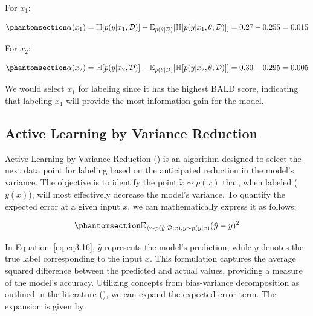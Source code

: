 \documentclass[
  letterpaper,
  numbers=noenddot,
  DIV=11]{scrreprt}
\theoremstyle{plain}
\theoremstyle{definition}
\theoremstyle{plain}
\theoremstyle{remark}
\begin{document}
For \(x_1\):

\begin{equation}\phantomsection\label{eq-eq3.14}{
\alpha(x_1) = \mathbb{H}[p(y|x_1, \mathcal{D})] - \mathbb{E}_{p(\theta|\mathcal{D})}[\mathbb{H}[p(y|x_1, \theta, \mathcal{D})]] = 0.27 - 0.255 = 0.015
}\end{equation}

For \(x_2\):

\begin{equation}\phantomsection\label{eq-eq3.15}{
\alpha(x_2) = \mathbb{H}[p(y|x_2, \mathcal{D})] - \mathbb{E}_{p(\theta|\mathcal{D})}[\mathbb{H}[p(y|x_2, \theta, \mathcal{D})]] = 0.30 - 0.295 = 0.005
}\end{equation}

We would select \(x_1\) for labeling since it has the highest BALD
score, indicating that labeling \(x_1\) will provide the most
information gain for the model.

\subsection{Active Learning by Variance
Reduction}\label{active-learning-by-variance-reduction}

Active Learning by Variance Reduction () is an algorithm designed to select the
next data point for labeling based on the anticipated reduction in the
model's variance. The objective is to identify the point
\(\tilde{x} \sim p(x)\) that, when labeled (\(y(\tilde{x})\)), will most
effectively decrease the model's variance. To quantify the expected
error at a given input \(x\), we can mathematically express it as
follows:

\begin{equation}\phantomsection\label{eq-eq3.16}{
\mathbb{E}_{\hat{y} \sim p(\hat{y} | \mathcal{D}; x), y \sim p(y|x)} (\hat{y} - y)^2
}\end{equation}

In Equation~\ref{eq-eq3.16}, \(\hat{y}\) represents the model's
prediction, while \(y\) denotes the true label corresponding to the
input \(x\). This formulation captures the average squared difference
between the predicted and actual values, providing a measure of the
model's accuracy. Utilizing concepts from bias-variance decomposition as
outlined in the literature
(), we can expand the expected error term. The expansion is given
by:
\end{document}
